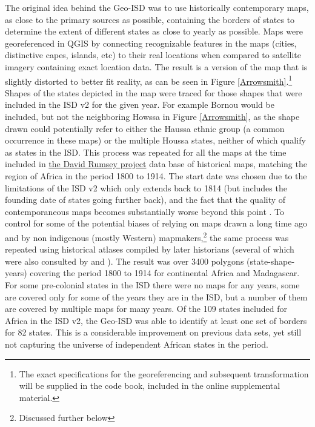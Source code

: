 \documentclass[12pt]{article}
\begin{document}
The original idea behind the Geo-ISD was to use historically contemporary maps,
as close to the primary sources as possible, containing the borders of states to
determine the extent of different states as close to yearly as possible. Maps
were georeferenced in QGIS by connecting recognizable features in the maps
(cities, distinctive capes, islands, etc) to their real locations when compared
to satellite imagery containing exact location data.  The result is a version of
the map that is slightly distorted to better fit reality, as can be seen in
Figure \ref{Arrowsmith}.\footnote{The exact specifications for the
georeferencing and subsequent transformation will be supplied in the code book,
included in the online supplemental material.} Shapes of the states depicted in
the map were traced for those shapes that were included in the ISD v2 for the
given year. For example Bornou would be included, but not the neighboring Howssa
in Figure \ref{Arrowsmith}, as the shape drawn could potentially refer to either
the Haussa ethnic group (a common occurrence in these maps) or the multiple
Houssa states, neither of which qualify as states in the ISD. This process was
repeated for all the maps at the time included in
\href{https://www.davidrumsey.com}{the David Rumsey project} data base of
historical maps, matching the region of Africa in the period 1800 to 1914. The
start date was chosen due to the limitations of the ISD v2 which only extends
back to 1814 (but includes the founding date of states going further back), and
the fact that the quality of contemporaneous maps becomes substantially  worse
beyond this point \citep{Bassett_1994}. To control for some of the potential
biases of relying on maps drawn a long time ago and by non indigenous (mostly
Western) mapmakers,\footnote{Discussed further below} the same process was
repeated using historical atlases compiled by later historians (several of which
were also consulted by \citet{Depetris-Chauvin2016} and \citet{Paine2019}). The
result was over 3400 polygons (state-shape-years) covering the period 1800 to
1914 for continental Africa and Madagascar. For some pre-colonial states in the
ISD there were no maps for any years, some are covered only for some of the
years they are in the ISD, but a number of them are covered by multiple maps for
many years. Of the 109 states included for Africa in the ISD v2, the Geo-ISD was
able to identify at least one set of borders for 82 states. This is a considerable
improvement on previous data sets, yet still not capturing the universe of
independent African states in the period.
\end{document}
